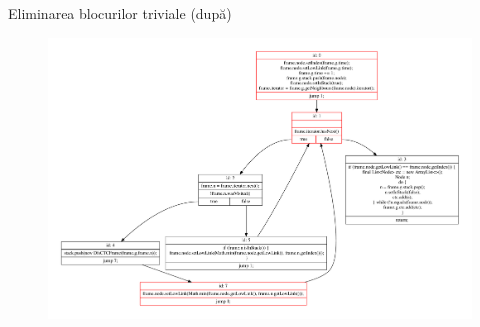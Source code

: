 \documentclass{beamer}
\begin{document}
\begin{frame}{Eliminarea blocurilor triviale (după)}
    \begin{figure}[htb]
        \centering
        \includegraphics[width=\linewidth]{../../../theses/diploma/src/graph/trivial-after.pdf}
    \end{figure}
\end{frame}

\end{document}

